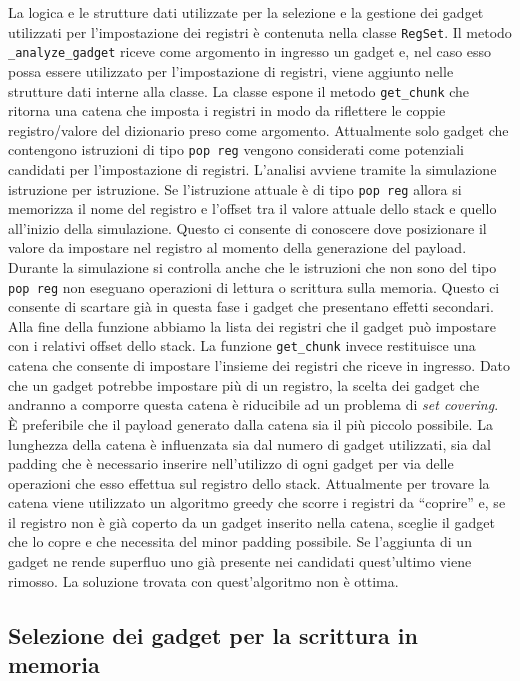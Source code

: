 La logica e le strutture dati utilizzate per la selezione e la
gestione dei gadget utilizzati per l'impostazione dei registri è
contenuta nella classe \lstinline{RegSet}. Il metodo
\lstinline{_analyze_gadget} riceve come argomento in ingresso un
gadget e, nel caso esso possa essere utilizzato per l'impostazione di
registri, viene aggiunto nelle strutture dati interne alla classe. La
classe espone il metodo \lstinline{get_chunk} che ritorna una catena
che imposta i registri in modo da riflettere le coppie registro/valore
del dizionario preso come argomento. Attualmente solo gadget che
contengono istruzioni di tipo \lstinline{pop reg} vengono considerati
come potenziali candidati per l'impostazione di registri. L'analisi
avviene tramite la simulazione istruzione per istruzione. Se
l'istruzione attuale è di tipo \lstinline{pop reg} allora si memorizza
il nome del registro e l'offset tra il valore attuale dello stack e
quello all'inizio della simulazione. Questo ci consente di conoscere
dove posizionare il valore da impostare nel registro al momento della
generazione del payload. Durante la simulazione si controlla anche che
le istruzioni che non sono del tipo \lstinline{pop reg} non eseguano
operazioni di lettura o scrittura sulla memoria. Questo ci consente di
scartare già in questa fase i gadget che presentano effetti
secondari. Alla fine della funzione abbiamo la lista dei registri che
il gadget può impostare con i relativi offset dello stack. La funzione
\lstinline{get_chunk} invece restituisce una catena che consente di
impostare l'insieme dei registri che riceve in ingresso. Dato che un
gadget potrebbe impostare più di un registro, la scelta dei gadget che
andranno a comporre questa catena è riducibile ad un problema di
\emph{set covering}. È preferibile che il payload generato dalla
catena sia il più piccolo possibile. La lunghezza della catena è
influenzata sia dal numero di gadget utilizzati, sia dal padding che è
necessario inserire nell'utilizzo di ogni gadget per via delle
operazioni che esso effettua sul registro dello stack. Attualmente per
trovare la catena viene utilizzato un algoritmo greedy che scorre i
registri da ``coprire'' e, se il registro non è già coperto da un
gadget inserito nella catena, sceglie il gadget che lo copre e che
necessita del minor padding possibile. Se l'aggiunta di un gadget ne
rende superfluo uno già presente nei candidati quest'ultimo viene
rimosso. La soluzione trovata con quest'algoritmo non è ottima.

\subsection{Selezione dei gadget per la scrittura in memoria}
\label{sec:memorystore}

